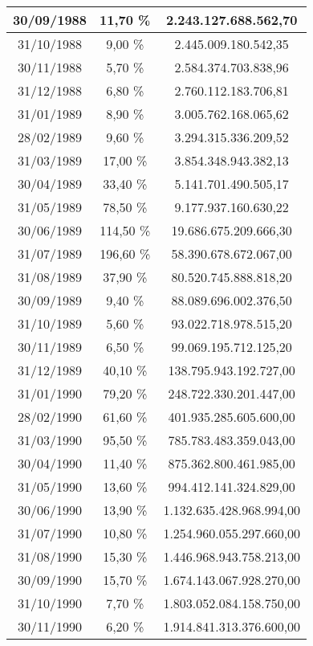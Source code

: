 \begin{center}
\begin{longtable}{|c|c|c|}
30/09/1988 & 11,70 \% & 2.243.127.688.562,70  \\ \hline
31/10/1988 & 9,00 \% & 2.445.009.180.542,35  \\ \hline
30/11/1988 & 5,70 \% & 2.584.374.703.838,96  \\ \hline
31/12/1988 & 6,80 \% & 2.760.112.183.706,81  \\ \hline
31/01/1989 & 8,90 \% & 3.005.762.168.065,62  \\ \hline
28/02/1989 & 9,60 \% & 3.294.315.336.209,52  \\ \hline
31/03/1989 & 17,00 \% & 3.854.348.943.382,13  \\ \hline
30/04/1989 & 33,40 \% & 5.141.701.490.505,17  \\ \hline
31/05/1989 & 78,50 \% & 9.177.937.160.630,22  \\ \hline
30/06/1989 & 114,50 \% & 19.686.675.209.666,30  \\ \hline
31/07/1989 & 196,60 \% & 58.390.678.672.067,00  \\ \hline
31/08/1989 & 37,90 \% & 80.520.745.888.818,20  \\ \hline
30/09/1989 & 9,40 \% & 88.089.696.002.376,50  \\ \hline
31/10/1989 & 5,60 \% & 93.022.718.978.515,20  \\ \hline
30/11/1989 & 6,50 \% & 99.069.195.712.125,20  \\ \hline
31/12/1989 & 40,10 \% & 138.795.943.192.727,00  \\ \hline
31/01/1990 & 79,20 \% & 248.722.330.201.447,00  \\ \hline
28/02/1990 & 61,60 \% & 401.935.285.605.600,00  \\ \hline
31/03/1990 & 95,50 \% & 785.783.483.359.043,00  \\ \hline
30/04/1990 & 11,40 \% & 875.362.800.461.985,00  \\ \hline
31/05/1990 & 13,60 \% & 994.412.141.324.829,00  \\ \hline
30/06/1990 & 13,90 \% & 1.132.635.428.968.994,00  \\ \hline
31/07/1990 & 10,80 \% & 1.254.960.055.297.660,00  \\ \hline
31/08/1990 & 15,30 \% & 1.446.968.943.758.213,00  \\ \hline
30/09/1990 & 15,70 \% & 1.674.143.067.928.270,00  \\ \hline
31/10/1990 & 7,70 \% & 1.803.052.084.158.750,00  \\ \hline
30/11/1990 & 6,20 \% & 1.914.841.313.376.600,00  \\ \hline

\end{longtable}
\end{center}
